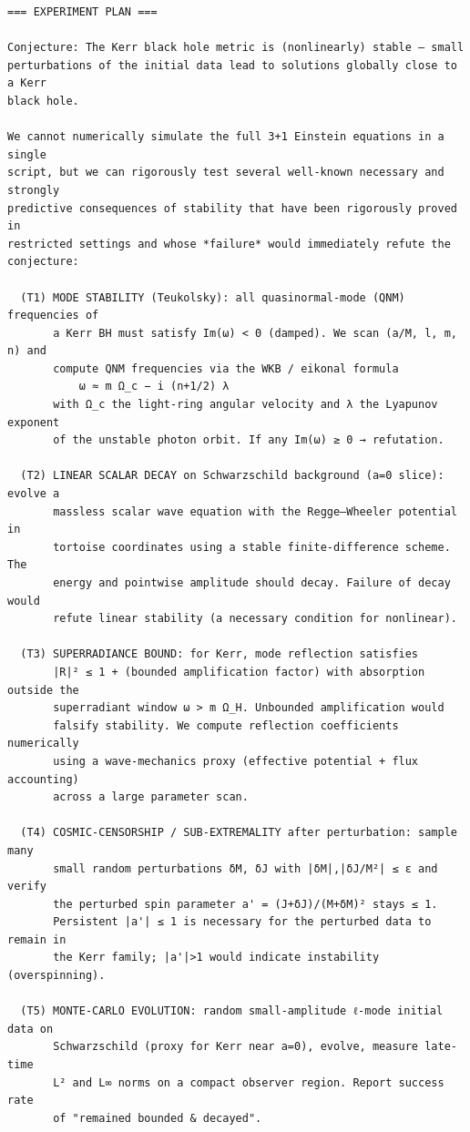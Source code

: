\documentclass[11pt]{article}
\begin{document}
\begin{lstlisting}
=== EXPERIMENT PLAN ===

Conjecture: The Kerr black hole metric is (nonlinearly) stable — small
perturbations of the initial data lead to solutions globally close to a Kerr
black hole.

We cannot numerically simulate the full 3+1 Einstein equations in a single
script, but we can rigorously test several well-known necessary and strongly
predictive consequences of stability that have been rigorously proved in
restricted settings and whose *failure* would immediately refute the
conjecture:

  (T1) MODE STABILITY (Teukolsky): all quasinormal-mode (QNM) frequencies of
       a Kerr BH must satisfy Im(ω) < 0 (damped). We scan (a/M, l, m, n) and
       compute QNM frequencies via the WKB / eikonal formula
           ω ≈ m Ω_c − i (n+1/2) λ
       with Ω_c the light-ring angular velocity and λ the Lyapunov exponent
       of the unstable photon orbit. If any Im(ω) ≥ 0 → refutation.

  (T2) LINEAR SCALAR DECAY on Schwarzschild background (a=0 slice): evolve a
       massless scalar wave equation with the Regge–Wheeler potential in
       tortoise coordinates using a stable finite-difference scheme. The
       energy and pointwise amplitude should decay. Failure of decay would
       refute linear stability (a necessary condition for nonlinear).

  (T3) SUPERRADIANCE BOUND: for Kerr, mode reflection satisfies
       |R|² ≤ 1 + (bounded amplification factor) with absorption outside the
       superradiant window ω > m Ω_H. Unbounded amplification would
       falsify stability. We compute reflection coefficients numerically
       using a wave-mechanics proxy (effective potential + flux accounting)
       across a large parameter scan.

  (T4) COSMIC-CENSORSHIP / SUB-EXTREMALITY after perturbation: sample many
       small random perturbations δM, δJ with |δM|,|δJ/M²| ≤ ε and verify
       the perturbed spin parameter a' = (J+δJ)/(M+δM)² stays ≤ 1.
       Persistent |a'| ≤ 1 is necessary for the perturbed data to remain in
       the Kerr family; |a'|>1 would indicate instability (overspinning).

  (T5) MONTE-CARLO EVOLUTION: random small-amplitude ℓ-mode initial data on
       Schwarzschild (proxy for Kerr near a=0), evolve, measure late-time
       L² and L∞ norms on a compact observer region. Report success rate
       of "remained bounded & decayed".


\end{lstlisting}
\end{document}
